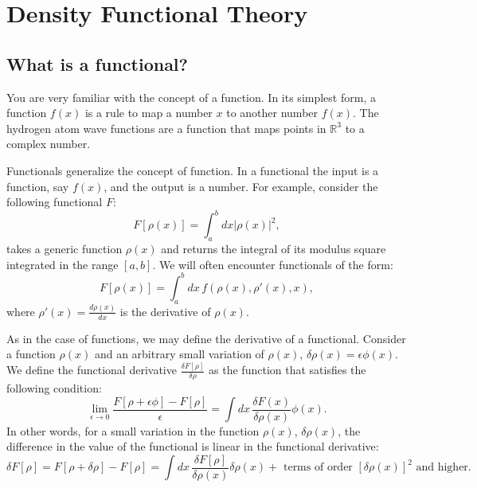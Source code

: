 \documentclass[../Main/chem532-notes.tex]{subfiles}
\begin{document}
\setcounter{chapter}{6}

\chapter{Density Functional Theory}

\section{What is a functional?}
You are very familiar with the concept of a function. In its simplest form, a function $f(x)$ is a rule to map a number $x$ to another number $f(x)$.
The hydrogen atom wave functions are a function that maps points in $\mathbb{R}^3$ to a complex number.

Functionals generalize the concept of function. In a functional the input is a function, say $f(x)$, and the output is a number.
For example, consider the following functional $F$:
\begin{equation}
F[\rho(x)] = \int_a^b dx |\rho(x)|^2,
\end{equation}
takes a generic function $\rho(x)$ and returns the integral of its modulus square integrated in the range $[a,b]$.
We will often encounter functionals of the form:
\begin{equation}
\label{eq:functional_f}
F[\rho(x)] = \int_a^b dx\,f(\rho(x),\rho'(x),x),
\end{equation}
where $\rho'(x) = \frac{d\rho(x)}{dx}$ is the derivative of $\rho(x)$.

As in the case of functions, we may define the derivative of a functional.
Consider a function $\rho(x)$ and an arbitrary small variation of $\rho(x)$, $\delta\rho(x) = \epsilon \phi(x)$.
We define the functional derivative $\frac{\delta F[\rho]}{\delta \rho}$ as the function that satisfies the following condition:
\begin{equation}
\lim_{\epsilon \rightarrow 0} \frac{F[\rho + \epsilon \phi] - F[\rho]}{\epsilon}
= \int dx \,\frac{\delta F(x)}{\delta \rho(x)} \phi(x).
\end{equation}
In other words, for a small variation in the function $\rho(x)$, $\delta \rho(x)$, the difference in the value of the functional is linear in the functional derivative:
\begin{equation}
\delta F[\rho] = F[\rho + \delta\rho] - F[\rho] = \int dx \,\frac{\delta F[\rho]}{\delta \rho(x)} \delta\rho(x) + \text{ terms of order } [\delta\rho(x)]^2 \text{ and higher}.
\end{equation}
\end{document}

